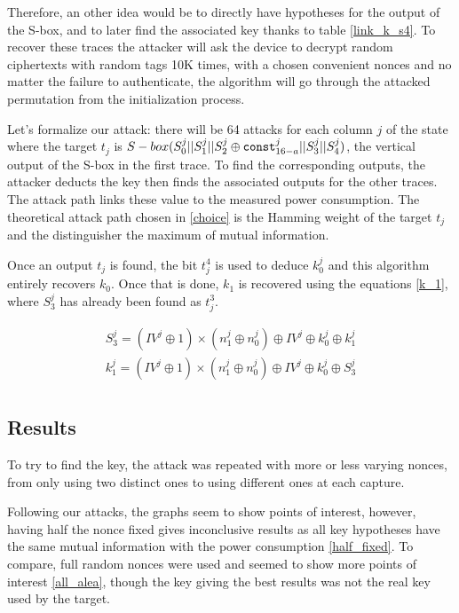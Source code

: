 \documentclass[a4paper,11pt,twocolumn]{article}
\begin{document}
	Therefore, an other idea would be to directly have hypotheses for the output of the S-box, and to later find the associated key thanks to table \ref{link_k_s4}. To recover these traces the attacker will ask the device to decrypt random ciphertexts with random tags 10K times, with a chosen convenient nonces and no matter the failure to authenticate, the algorithm will go through the attacked permutation from the initialization process.
	
	Let's formalize our attack: there will be 64 attacks for each column $j$ of the state where the target $t_j$ is $S-box(S_0^j||S_1^j||S_2^j \oplus \verb|const|_{16-a}^j||S_3^j||S_4^j)$, the vertical output of the S-box in the first trace. To find the corresponding outputs, the attacker deducts the key then finds the associated outputs for the other traces. The attack path links these value to the measured power consumption. The theoretical attack path chosen in \ref{choice} is the Hamming weight of the target $t_j$ and the distinguisher the maximum of mutual information.
	
	Once an output $t_j$ is found, the bit $t_j^4$ is used to deduce $k_0^j$ and this algorithm entirely recovers $k_0$. Once that is done, $k_1$ is recovered using the equations \ref{k_1}, where $S_3^j$ has already been found as $t_j^3$.
	
	\begin{gather*} \label{k_1}
		S_3^j = (IV^j \oplus 1) \times (n_1^j \oplus n_0^j) \oplus IV^j \oplus k_0^j \oplus k_1^j\\
		k_1^j = (IV^j \oplus 1) \times (n_1^j \oplus n_0^j) \oplus IV^j \oplus k_0^j \oplus S_3^j\\
	\end{gather*}
	
	\subsection{Results}
	To try to find the key, the attack was repeated with more or less varying nonces, from only using two distinct ones to using different ones at each capture.
	
	Following our attacks, the graphs seem to show points of interest, however, having half the nonce fixed gives inconclusive results as all key hypotheses have the same mutual information with the power consumption \ref{half_fixed}. To compare, full random nonces were used and seemed to show more points of interest \ref{all_alea}, though the key giving the best results was not the real key used by the target.
	
\end{document}
